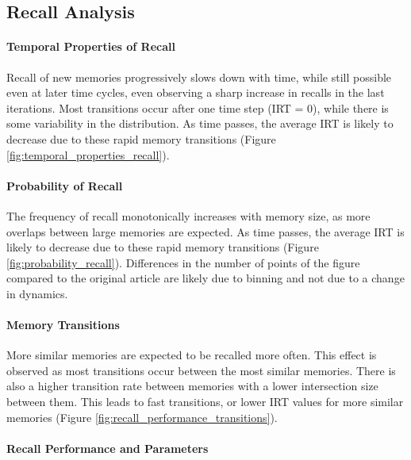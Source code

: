\subsection{Recall Analysis}
    \paragraph{Temporal Properties of Recall}

    Recall of new memories progressively slows down with time, while still possible even at later time cycles, even observing a sharp increase in recalls in the last iterations.
    Most transitions occur after one time step (IRT = 0), while there is some variability in the distribution.
    As time passes, the average IRT is likely to decrease due to these rapid memory transitions (Figure \ref{fig:temporal_properties_recall}).

    \paragraph{Probability of Recall}

    The frequency of recall monotonically increases with memory size, as more overlaps between large memories are expected.
    As time passes, the average IRT is likely to decrease due to these rapid memory transitions (Figure \ref{fig:probability_recall}).
    Differences in the number of points of the figure compared to the original article are likely due to binning and not due to a change in dynamics. 
    
    \paragraph{Memory Transitions}
    
    More similar memories are expected to be recalled more often.
    This effect is observed as most transitions occur between the most similar memories.
    There is also a higher transition rate between memories with a lower intersection size between them.
    This leads to fast transitions, or lower IRT values for more similar memories (Figure \ref{fig:recall_performance_transitions}).

    \paragraph{Recall Performance and Parameters}

